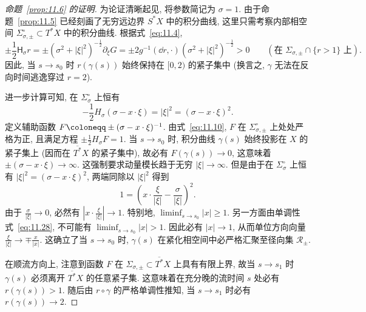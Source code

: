 \begin{proof}[命题~\ref{prop:11.6} 的证明]
为论证清晰起见, 将参数简记为 $\sigma = 1$. 由于命题~\ref{prop:11.5} 已经刻画了无穷远边界 $S^* X$ 中的积分曲线, 这里只需考察内部相空间 $\Sigma_{\sigma, \pm}^\circ \subset T^* X$ 中的积分曲线. 根据式~\eqref{eq:11.4},
\begin{equation}\label{eq:11.28}
    \pm \frac{1}{2} \mathsf{H}_\sigma r = \pm(\sigma^2 + |\xi|^2)^{-\frac{1}{2}} \partial_\xi G = \pm 2 g^{-1}(\dd r, \cdot)(\sigma^2 + |\xi|^2)^{-\frac{1}{2}} > 0 \qquad (\text{在 } \Sigma_{\sigma, \pm} \cap \{r > 1\} \text{ 上}).
\end{equation}
因此, 当 $s \to s_0$ 时 $r(\gamma(s))$ 始终保持在 $[0, 2)$ 的紧子集中 (换言之, $\gamma$ 无法在反向时间逃逸穿过 $r = 2$).

进一步计算可知, 在 $\Sigma_\sigma^\circ$ 上恒有
\begin{equation}\label{eq:11.29}
    -\frac{1}{2} H_\sigma(\sigma - x \cdot \xi) = |\xi|^2 = (\sigma - x \cdot \xi)^2.
\end{equation}
定义辅助函数 $F \defeq \pm(\sigma - x \cdot \xi)^{-1}$. 由式~\eqref{eq:11.10}, $F$ 在 $\Sigma_{\sigma, \pm}^\circ$ 上处处严格为正, 且满足方程 $\pm \frac{1}{2} H_\sigma F = 1$. 当 $s \to s_0$ 时, 积分曲线 $\gamma(s)$ 始终投影在 $X$ 的紧子集上 (因而在 $\overline{T^*} X$ 的紧子集中), 故必有 $F(\gamma(s)) \to 0$, 这意味着 $\pm(\sigma - x \cdot \xi) \to \infty$. 这强制要求动量模长趋于无穷 $|\xi| \to \infty$. 但是由于在 $\Sigma_\sigma^\circ$ 上恒有 $|\xi|^2 = (\sigma - x \cdot \xi)^2$, 两端同除以 $|\xi|^2$ 得到
\begin{equation}\label{eq:11.30}
    1 = \left( x \cdot \frac{\xi}{|\xi|} - \frac{\sigma}{|\xi|} \right)^2.
\end{equation}
由于 $\frac{\sigma}{|\xi|} \to 0$, 必然有 $|x \cdot \frac{\xi}{|\xi|}| \to 1$. 特别地, $\liminf_{s \to s_0} |x| \ge 1$. 另一方面由单调性式~\eqref{eq:11.28}, 不可能有 $\liminf_{s \to s_0} |x| > 1$. 因此必有 $|x| \to 1$, 从而单位方向向量 $\frac{\xi}{|\xi|} \to \mp \frac{x}{|x|}$. 这确立了当 $s \to s_0$ 时, $\gamma(s)$ 在紧化相空间中必严格汇聚至径向集 $\mathcal{R}_\pm$.

在顺流方向上, 注意到函数 $F$ 在 $\Sigma_{\sigma, \pm} \subset \overline{T^*} X$ 上具有有限上界, 故当 $s \to s_1$ 时 $\gamma(s)$ 必须离开 $\overline{T^*} X$ 的任意紧子集. 这意味着在充分晚的流时间 $s$ 处必有 $r(\gamma(s)) > 1$. 随后由 $r \circ \gamma$ 的严格单调性推知, 当 $s \to s_1$ 时必有 $r(\gamma(s)) \to 2$.
\end{proof}

